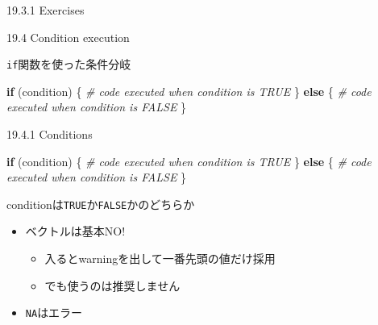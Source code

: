 \documentclass[ignorenonframetext,]{beamer}
\newenvironment{Shaded}{\begin{snugshade}}{\end{snugshade}}
\newcommand{\CommentTok}[1]{\textcolor[rgb]{0.56,0.35,0.01}{\textit{#1}}}
\newcommand{\ControlFlowTok}[1]{\textcolor[rgb]{0.13,0.29,0.53}{\textbf{#1}}}
\newcommand{\NormalTok}[1]{#1}
\providecommand{\tightlist}{%
  \setlength{\itemsep}{0pt}\setlength{\parskip}{0pt}}
\begin{document}
\begin{frame}{19.3.1 Exercises}

\end{frame}

\begin{frame}[fragile]{19.4 Condition execution}

\texttt{if}関数を使った条件分岐

\begin{Shaded}
\begin{Highlighting}[]
\ControlFlowTok{if}\NormalTok{ (condition) \{}
    \CommentTok{# code executed when condition is TRUE}
\NormalTok{\} }\ControlFlowTok{else}\NormalTok{ \{}
    \CommentTok{# code executed when condition is FALSE}
\NormalTok{\}}
\end{Highlighting}
\end{Shaded}

\end{frame}

\begin{frame}[fragile]{19.4.1 Conditions}

\begin{Shaded}
\begin{Highlighting}[]
\ControlFlowTok{if}\NormalTok{ (condition) \{}
    \CommentTok{# code executed when condition is TRUE}
\NormalTok{\} }\ControlFlowTok{else}\NormalTok{ \{}
    \CommentTok{# code executed when condition is FALSE}
\NormalTok{\}}
\end{Highlighting}
\end{Shaded}

conditionは\texttt{TRUE}か\texttt{FALSE}かのどちらか

\begin{itemize}
\tightlist
\item
  ベクトルは基本NO!

  \begin{itemize}
  \tightlist
  \item
    入るとwarningを出して一番先頭の値だけ採用
  \item
    でも使うのは推奨しません
  \end{itemize}
\item
  \texttt{NA}はエラー
\end{itemize}

\end{frame}
\end{document}
